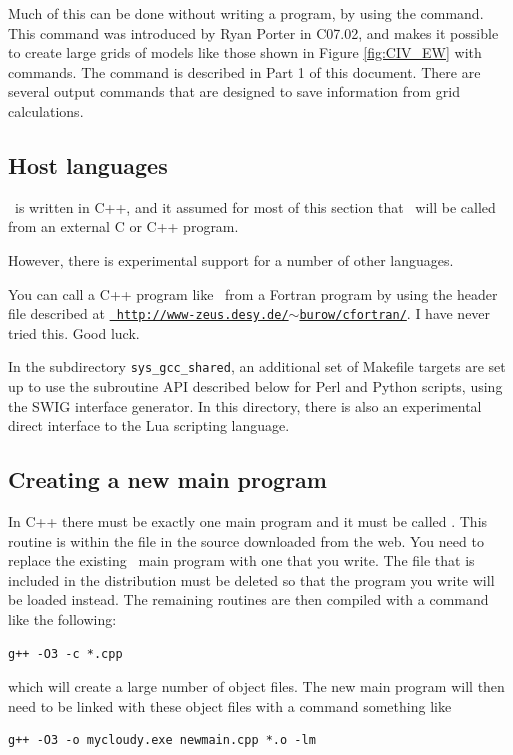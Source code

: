 Much of this can be done without writing a program,
by using the  command.
This command was introduced by Ryan Porter in C07.02, and makes
it possible to create large grids of models like those shown in
Figure \ref{fig:CIV_EW} with commands.
The  command is described in Part 1 of this document.
There are several  output commands that are designed to save information
from grid calculations.

\begin{shaded}
\subsection{\experimental Host languages}

\Cloudy\ is written in C++, and it assumed for most of this section
that \Cloudy\ will be called from an external C or C++ program.

However, there is experimental support for a number of other
languages.

You can call a C++ program like \Cloudy\ from a Fortran program by
using the  header file described at
\href{http://www-zeus.desy.de/~burow/cfortran/}{\tt
http://www-zeus.desy.de/$\sim{}$burow/cfortran/}.  I have never tried
this.  Good luck.

In the subdirectory \verb|sys_gcc_shared|, an additional set of
Makefile targets are set up to use the subroutine API described below
for Perl and Python scripts, using the SWIG interface generator.  In
this directory, there is also an experimental direct interface to the
Lua scripting language.
\end{shaded}

\subsection{Creating a new main program}

In C++ there must be exactly one main program
and it must be called .
This routine is within the file  in the source downloaded from
the web.
You need to replace the existing \Cloudy\ main program with one
that you write.
The file  that is included in the distribution
must be deleted so that the program you write will be loaded instead.
The
remaining routines are then compiled with a command like the following:
\begin{verbatim}
g++ -O3 -c *.cpp
\end{verbatim}
which will create a large number of object files.  The new main
program will then need to be linked with these object files with a
command something like
\begin{verbatim}
g++ -O3 -o mycloudy.exe newmain.cpp *.o -lm
\end{verbatim}

